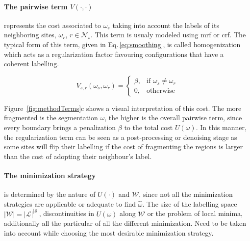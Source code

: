\paragraph{The pairwise term $V(\cdot,\cdot)$} \label{sec:method:mrfTerm}
represents the cost associated to $\omega_s$ taking into account the labels of its neighboring sites, $\omega_r$, $r \in \mathcal{N}_{s}$.
This term is usualy modeled using \ac{mrf} or \ac{crf}.
The typical form of this term, given in Eq.\,\eqref{eq:smoothing}, is called homogenization which acts as a regularization factor favouring configurations that have a coherent labelling.

\begin{equation}
V_{s,r}(\omega_s,\omega_r) =
\begin{cases}
    \beta, & \text{if } \omega_s \ne \omega_r\\
    0,              & \text{otherwise}
\end{cases}
\label{eq:smoothing}
\end{equation}

Figure~\ref{fig:methodTerms}c shows a visual interpretation of this cost.
The more fragmented is the segmentation $\omega$, the higher is the overall pairwise term, since every boundary brings a penalization $\beta$ to the total cost $U(\omega)$.
In this manner, the regularization term can be seen as a post-processing or denoising stage as some sites will flip their labelling if the cost of fragmenting the regions is larger than the cost of adopting their neighbour's label.


\paragraph{The minimization strategy} \label{sec:method:min}
is determined by the nature of $U(\cdot)$ and $\mathcal{W}$, since not all the minimization strategies are applicable or adequate to find $\hat{\omega}$.
The size of the labelling space $|\mathcal{W}|=|\mathcal{L}|^{|\mathcal{S}|}$, discontinuities in $U(\omega)$ along $\mathcal{W}$ or the problem of local minima,
additionally all the particular of all the different minimization.
Need to be taken into account while choosing the most desirable minimization strategy.

